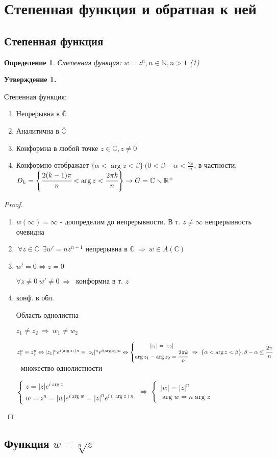 \documentclass[draft]{report}
\newcommand{\forcenewline}{$\phantom{\mbox{newline}}$}
\newcommand{\then}{\ \Rightarrow\ }
\newcommand{\R}{\mathbb{R}}
\renewcommand{\C}{\mathbb{C}}
\newcommand{\N}{\mathbb{N}}
\newcommand{\LRA}{\Leftrightarrow}
\renewcommand{\bar}{\overline}
\renewcommand{\a}{\alpha}
\renewcommand{\b}{\beta}
\newcommand{\E}{\ \exists}
\newcommand{\F}{\ \forall}
\newcommand{\CC}{\bar{\C}}
\newcommand{\sys}[1]{\left\{\begin{matrix}#1\end{matrix}\right.}
\newcommand{\opr}[1]{\begin{opred}#1\end{opred}}
\newtheorem*{opred}{Определение}
\theoremstyle{remark}
\begin{document}
\section{Степенная функция и обратная к ней}

\subsection{Степенная функция}

\opr{Степенная функция: $w=z^n, n\in \N, n>1$ (1)}
{\bfseries Утверждение 1.}

Степенная функция:
\begin{enumerate}
\item Непрерывна в $\CC$
\item Аналитична в $\CC$
\item Конформна в любой точке $z\in\C,z\neq0$
\item Конформно отображает $\{\a<\arg z<\b\}\ (0<\b-\a<\frac{2\pi}{n}$, в частности, $D_k=\left\{\cfrac{2(k-1)\pi}{n}<\arg z<\cfrac{2\pi k}{n}\right\}\to G=\C\smallsetminus\R^+$
\end{enumerate}
\begin{proof}
\forcenewline
\begin{enumerate}
\item $w(\infty)=\infty$ - доопределим до непрерывности. В т. $z\neq\infty$ непрерывность очевидна
\item $\F z\in\C\ \E w'=nz^{n-1}$ непрерывна в $\C\then w\in A(\C)$
\item $w'=0\LRA z=0$

$\forall z\neq0\ w'\neq0\then$ конформна в т. $z$
\item конф. в обл.

Область однолистна

$z_1\neq z_2\then w_1\neq w_2$

$z_1^n=z_2^n\LRA |z_1|^ne^{i(\arg z_1)n}=|z_2|^ne^{i(\arg z_2)n}\LRA\sys{|z_1|=|z_2| \\ \arg z_1-\arg z_2=\cfrac{2\pi k}{n}}\then \{\a<\arg z<\b\}, \b-\a\leq \cfrac{2\pi}{n}$ - множество однолистности

$\sys{z=|z|e^{i\arg z}\\w=z^n=|w|e^{i\arg w}=|z|^ne^{i(\arg z)n}}\then\sys{|w|=|z|^n \\ \arg w=n\arg z}$
\end{enumerate}
\end{proof}

\subsection{Функция $w=\sqrt[n]{z}$}
\end{document}
